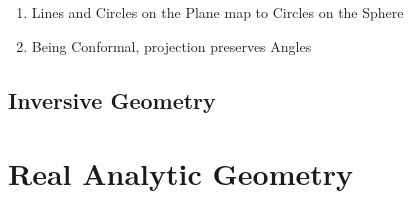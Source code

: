 \begin{enumerate}
  \item Lines and Circles on the Plane map to Circles on the Sphere
  \item Being Conformal, projection preserves Angles
\end{enumerate}



\subsection{Inversive Geometry}\label{sec:inversive_geometry}



\section{Real Analytic Geometry}\label{sec:real_analytic_geometry}
